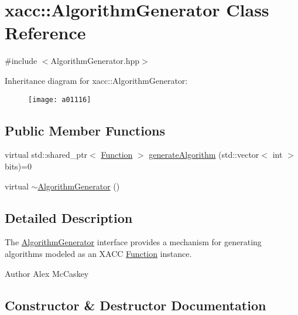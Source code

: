 \hypertarget{a01116}{}\section{xacc\+:\+:Algorithm\+Generator Class Reference}
\label{a01116}


{\ttfamily \#include $<$Algorithm\+Generator.\+hpp$>$}

Inheritance diagram for xacc\+:\+:Algorithm\+Generator\+:\begin{figure}[H]
\begin{center}
\leavevmode
\texttt{[image: a01116]}
\end{center}
\end{figure}
\subsection*{Public Member Functions}
\begin{DoxyCompactItemize}
\item 
virtual std\+::shared\+\_\+ptr$<$ \hyperlink{a01124}{Function} $>$ \hyperlink{a01116_a73023c06f0f0c62ad56ab4187b18b096}{generate\+Algorithm} (std\+::vector$<$ int $>$ bits)=0
\item 
virtual \hyperlink{a01116_a096f66aa8d65f5aa3276915768159579}{$\sim$\+Algorithm\+Generator} ()
\end{DoxyCompactItemize}


\subsection{Detailed Description}
The \hyperlink{a01116}{Algorithm\+Generator} interface provides a mechanism for generating algorithms modeled as an X\+A\+CC \hyperlink{a01124}{Function} instance.

\begin{DoxyAuthor}{Author}
Alex Mc\+Caskey 
\end{DoxyAuthor}


\subsection{Constructor \& Destructor Documentation}
\mbox{\label{a01116_a096f66aa8d65f5aa3276915768159579}} 
